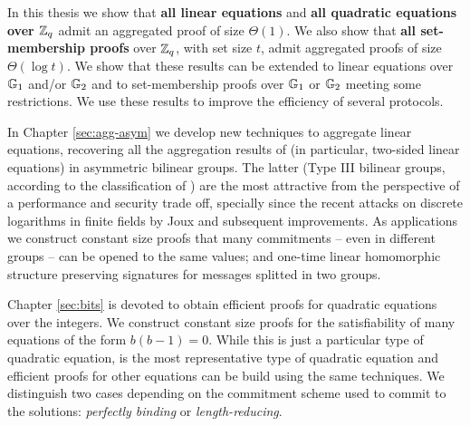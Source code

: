 In this thesis we show that \textbf{all linear equations} and \textbf{all quadratic equations over $\mathbb{Z}_q$} admit an aggregated proof of size $\Theta(1)$. We also show that \textbf{all set-membership proofs} over $\mathbb{Z}_q$, with set size $t$, admit aggregated proofs of size $\Theta(\log t)$. We show that these results can be extended to linear equations over $\mathbb{G}_1$ and/or $\mathbb{G}_2$ and to set-membership proofs over $\mathbb{G}_1$ or $\mathbb{G}_2$ meeting some restrictions. We use these results to improve the efficiency of several protocols. 
 


In Chapter \ref{sec:agg-asym} we develop new techniques to aggregate linear equations, recovering all the aggregation results of \cite{C:JutRoy14} (in particular, two-sided linear equations) in asymmetric bilinear groups. The latter (Type III bilinear groups, according to the classification of \cite{DAM:GalPatSma08}) are the most 
attractive 
from the perspective of a performance and security trade off, specially since the recent attacks on discrete logarithms in finite fields by Joux \cite{SAC:Joux13} and subsequent improvements. As applications we construct constant size proofs that many commitments -- even in different groups -- can be opened to the same values; and one-time linear homomorphic structure preserving signatures for messages splitted in two groups.

Chapter \ref{sec:bits} is devoted to obtain efficient proofs for quadratic equations over the integers. We construct constant size proofs for the satisfiability of many equations of the form $b(b-1)=0$. While this is just a particular type of quadratic equation, is the most representative type of quadratic equation and efficient proofs for other equations can be build using the same techniques. We distinguish two cases depending on the commitment scheme used to commit to the solutions: \emph{perfectly binding} or \emph{length-reducing}. 

